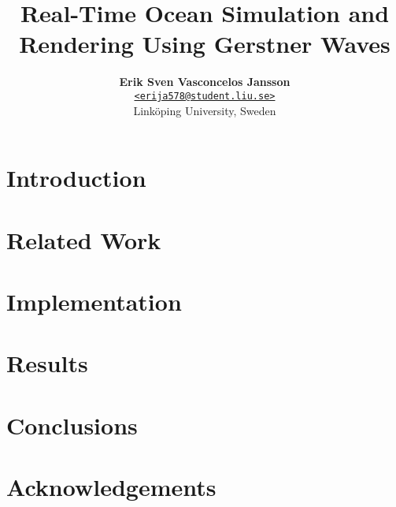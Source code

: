 \documentclass[a4paper, twocolumn]{article}
\title{\vspace{-1.5em}\textbf{Real-Time Ocean Simulation and \\
                              Rendering Using Gerstner Waves}}
\author{{\textbf{Erik Sven Vasconcelos Jansson}} \\
        {\href{mailto:erija578@student.liu.se}
        {\texttt{<erija578@student.liu.se>}}} \\
        {Linköping University, Sweden}}
\begin{document}
    \maketitle

    \begin{abstract}  \end{abstract}
    \section{Introduction} \label{sec:introduction} 
    \section{Related Work} \label{sec:related_work} 
    \section{Implementation} \label{sec:implementation} 
    \section{Results} \label{sec:results} 
    \section{Conclusions} \label{sec:conclusions} 

    \newpage

    \section*{Acknowledgements}

    \nocite{*} %
    
    

    \appendix
    \clearpage \onecolumn
    
\end{document}
